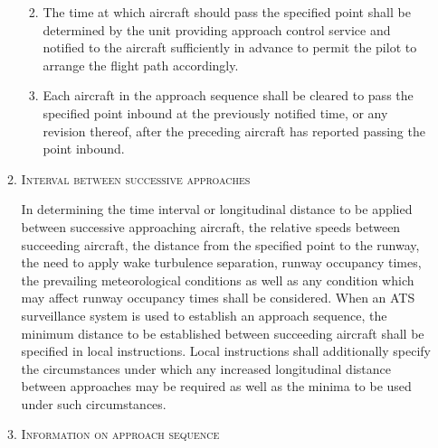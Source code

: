 \documentclass[../main.tex]{subfiles}
\begin{document}
\begin{enumerate}[itemsep=0.2cm]
\begin{enumerate}[labelindent=0pt,itemsep=0.2cm]
\begin{enumerate}

                \item The time at which aircraft should pass the specified point shall be determined by the unit providing approach control service and notified to the aircraft sufficiently in advance to permit the pilot to arrange the flight path accordingly.
                \item Each aircraft in the approach sequence shall be cleared to pass the specified point inbound at the previously notified time, or any revision thereof, after the preceding aircraft has reported passing the point inbound.
            \end{enumerate}

            \item \textsc{Interval between successive approaches}

            \noindent In determining the time interval or longitudinal distance to be applied between successive approaching aircraft, the relative speeds between succeeding aircraft, the distance from the specified point to the runway, the need to apply wake turbulence separation, runway occupancy times, the prevailing meteorological conditions as well as any condition which may affect runway occupancy times shall be considered. When an ATS surveillance system is used to establish an approach sequence, the minimum distance to be established between succeeding aircraft shall be specified in local instructions. Local instructions shall additionally specify the circumstances under which any increased longitudinal distance between approaches may be required as well as the minima to be used under such circumstances.

            \item \textsc{Information on approach sequence}


\end{enumerate}
\end{enumerate}
\end{document}
